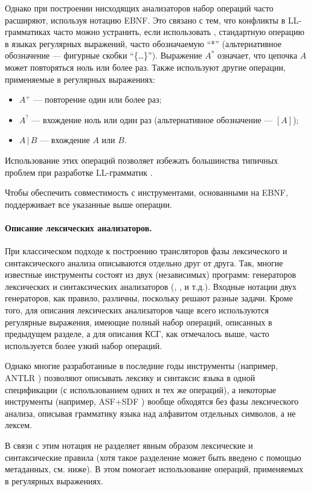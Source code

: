 Однако при построении нисходящих анализаторов набор операций часто расширяют, используя нотацию EBNF. Это связано с тем, что конфликты в LL-грамматиках часто можно устранить, если использовать , стандартную операцию в языках регулярных выражений, часто обозначаемую ``*'' (альтернативное обозначение --- фигурные скобки ``\{\ldots\}''). Выражение $A^*$ означает, что цепочка $A$ может повторяться ноль или более раз. Также используют другие операции, применяемые в регулярных выражениях:
\begin{itemize}
\item $A^+$ --- повторение один или более раз;
\item $A^?$ --- вхождение ноль или один раз (альтернативное обозначение --- $[A]$);
\item $A\,|\,B$ --- вхождение $A$ или $B$.
\end{itemize}
Использование этих операций позволяет избежать большинства типичных проблем при разработке LL-грамматик \cite{LL1Conf}. 

Чтобы обеспечить совместимость с инструментами, основанными на EBNF, \GRM{} поддерживает все указанные выше операции.

\paragraph*{Описание лексических анализаторов.}
При классическом подходе к построению трансляторов \cite{DragonBook} фазы лексического и синтаксического анализа описываются отдельно друг от друга. Так, многие известные инструменты состоят из двух (независимых) программ: генераторов лексических и синтаксических анализаторов (, ,  и т.д.). Входные нотации двух генераторов, как правило, различны, поскольку решают разные задачи. Кроме того, для описания лексических анализаторов чаще всего используются регулярные выражения, имеющие полный набор операций, описанных в предыдущем разделе, а для описания КСГ, как отмечалось выше, часто используется более узкий набор операций.

Однако многие разработанные в последние годы инструменты (например, ANTLR \cite{ANTLR}) позволяют описывать лексику и синтаксис языка в одной спецификации (с использованием одних и тех же операций), а некоторые инструменты (например, ASF+SDF \cite{ASF+SDF}) вообще обходятся без фазы лексического анализа, описывая грамматику языка над алфавитом отдельных символов, а не лексем.

В связи с этим нотация \GRM{} не разделяет явным образом лексические и синтаксические правила (хотя такое разделение может быть введено с помощью метаданных, см. ниже). В этом помогает использование операций, применяемых в регулярных выражениях.

